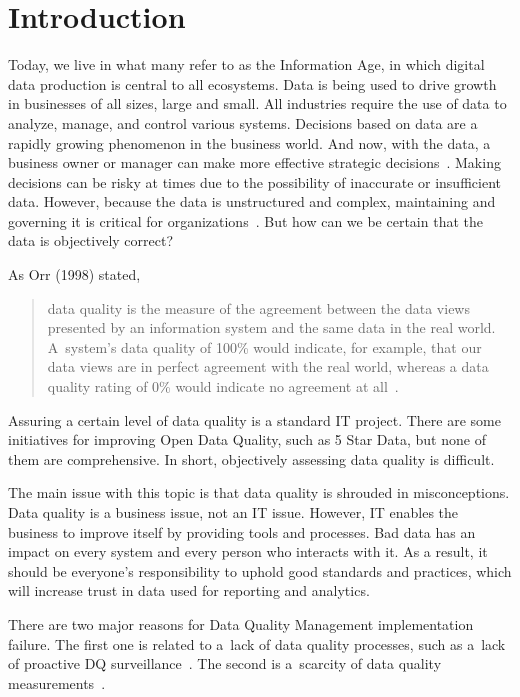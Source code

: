\chapter{Introduction}\label{ch:introduction}

Today, we live in what many refer to as the Information Age, in which digital data production is central to all ecosystems.
Data is being used to drive growth in businesses of all sizes, large and small.
All industries require the use of data to analyze, manage, and control various systems.
Decisions based on data are a rapidly growing phenomenon in the business world.
And now, with the data, a business owner or manager can make more effective strategic decisions~\cite{chaudhuri2011}.
Making decisions can be risky at times due to the possibility of inaccurate or insufficient data.
However, because the data is unstructured and complex, maintaining and governing it is critical for organizations~\cite{blumberg2003}.
But how can we be certain that the data is objectively correct?

As Orr (1998) stated,
\blockquote[][]{data quality is the measure of the agreement between the data views presented by an information system and the same data in the real world.
A~system's data quality of 100\% would indicate, for example, that our data views are in perfect agreement with the real world, whereas a data quality rating of 0\% would indicate no agreement at all~\cite{orr1998}.}

Assuring a certain level of data quality is a standard IT project.
There are some initiatives for improving Open Data Quality, such as 5 Star Data, but none of them are comprehensive.
In short, objectively assessing data quality is difficult.

The main issue with this topic is that data quality is shrouded in misconceptions.
Data quality is a business issue, not an IT issue.
However, IT enables the business to improve itself by providing tools and processes.
Bad data has an impact on every system and every person who interacts with it.
As a result, it should be everyone's responsibility to uphold good standards and practices, which will increase trust in data used for reporting and analytics.

There are two major reasons for Data Quality Management implementation failure.
The first one is related to a~lack of data quality processes, such as a~lack of proactive DQ surveillance~\cite{risto2011}.
The second is a~scarcity of data quality measurements~\cite{haug2013}.

